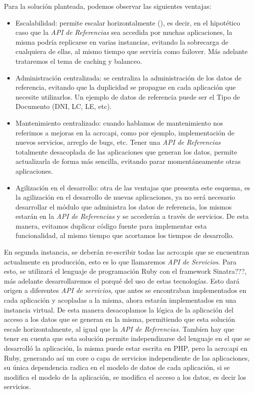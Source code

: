 Para la solución planteada, podemos observar las siguientes ventajas:

\begin{itemize}
  \item Escalabilidad: permite escalar horizontalmente (), es decir, en el hipotético caso que la \textit{API de Referencias} sea accedida por muchas aplicaciones, la misma podría replicarse en varias instancias, evitando la sobrecarga de cualquiera de ellas, al mismo tiempo que serviría como failover.  Más adelante trataremos el tema de caching y balanceo.

  \item Administración centralizada: se centraliza la administración de los datos de referencia, evitando que la duplicidad se propague en cada aplicación que necesite utilizarlos.  Un ejemplo de datos de referencia puede ser el Tipo de Documento (DNI, LC, LE, etc).

  \item Mantenimiento centralizado: cuando hablamos de mantenimiento nos referimos a mejoras en la \gls{acro:api}, como por ejemplo, implementación de nuevos servicios, arreglo de bugs, etc.  Tener una \textit{API de Referencias} totalmente desacoplada de las aplicaciones que generan los datos, permite actualizarla de forma más sencilla, evitando parar momentáneamente otras aplicaciones.

  \item Agilización en el desarrollo: otra de las ventajas que presenta este esquema, es la agilización en el desarrollo de nuevas aplicaciones, ya no será necesario desarrollar el módulo que administra los datos de referencia, los mismos estarán en la \textit{API de Referencias} y se accederán a través de servicios.  De esta manera, evitamos duplicar código fuente para implementar esta funcionalidad, al mismo tiempo que acortamos los tiempos de desarrollo.
\end{itemize}

En segunda instancia, se deberán re-escribir todas las \glspl{acro:api} que se encuentran actualmente en producción, esto es lo que llamaremos \textit{API de Servicios}.  Para esto, se utilizará el lenguaje de programación Ruby con el framework Sinatra???, más adelante desarrollaremos el porqué del uso de estas tecnologías.  Esto dará origen a diferentes \textit{API de servicios}, que antes se encontraban implementados en cada aplicación y acopladas a la misma, ahora estarán implementados en una instancia virtual.
De esta manera desacoplamos la lógica de la aplicación del acceso a los datos que se generan en la misma, permitiendo que esta solución escale horizontalmente, al igual que la \textit{API de Referencias}.
Tambíen hay que tener en cuenta que esta solución permite independizarse del lenguaje en el que se desarrolló la aplicación, la misma puede estar escrita en PHP, pero la \gls{acro:api} en Ruby, generando así un core o capa de servicios independiente de las aplicaciones, su única dependencia radica en el modelo de datos de cada aplicación, si se modifica el modelo de la aplicación, se modifica el acceso a los datos, es decir los servicios.

